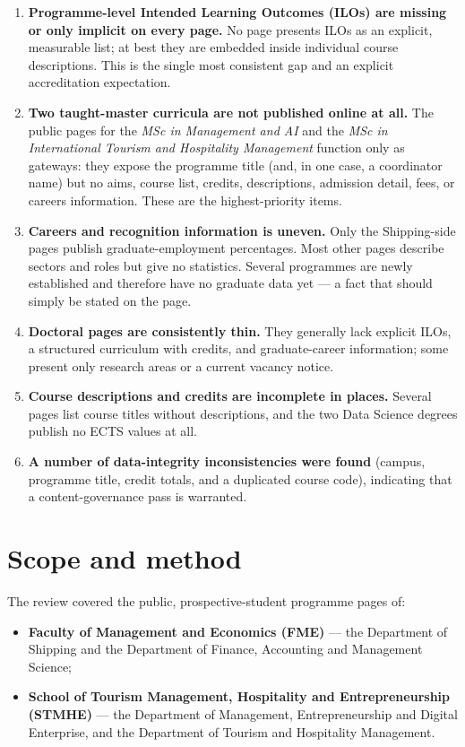 \documentclass[11pt,a4paper]{article}
\begin{document}
\begin{enumerate}[label=\arabic*.]
  \item \textbf{Programme-level Intended Learning Outcomes (ILOs) are missing or only implicit on every page.} No page presents ILOs as an explicit, measurable list; at best they are embedded inside individual course descriptions. This is the single most consistent gap and an explicit accreditation expectation.
  \item \textbf{Two taught-master curricula are not published online at all.} The public pages for the \emph{MSc in Management and AI} and the \emph{MSc in International Tourism and Hospitality Management} function only as gateways: they expose the programme title (and, in one case, a coordinator name) but no aims, course list, credits, descriptions, admission detail, fees, or careers information. These are the highest-priority items.
  \item \textbf{Careers and recognition information is uneven.} Only the Shipping-side pages publish graduate-employment percentages. Most other pages describe sectors and roles but give no statistics. Several programmes are newly established and therefore have no graduate data yet --- a fact that should simply be stated on the page.
  \item \textbf{Doctoral pages are consistently thin.} They generally lack explicit ILOs, a structured curriculum with credits, and graduate-career information; some present only research areas or a current vacancy notice.
  \item \textbf{Course descriptions and credits are incomplete in places.} Several pages list course titles without descriptions, and the two Data Science degrees publish no ECTS values at all.
  \item \textbf{A number of data-integrity inconsistencies were found} (campus, programme title, credit totals, and a duplicated course code), indicating that a content-governance pass is warranted.
\end{enumerate}

\section{Scope and method}

The review covered the public, prospective-student programme pages of:

\begin{itemize}
  \item \textbf{Faculty of Management and Economics (FME)} --- the Department of Shipping and the Department of Finance, Accounting and Management Science;
  \item \textbf{School of Tourism Management, Hospitality and Entrepreneurship (STMHE)} --- the Department of Management, Entrepreneurship and Digital Enterprise, and the Department of Tourism and Hospitality Management.
\end{itemize}
\end{document}

